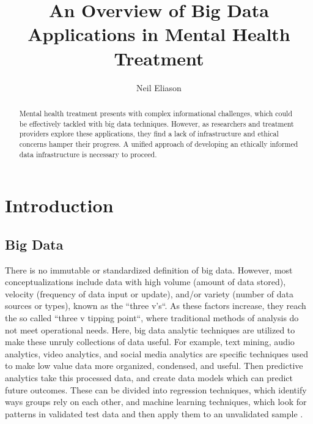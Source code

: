 \documentclass[sigconf]{acmart}
\begin{document}
\title{An Overview of Big Data Applications in Mental Health Treatment}


\author{Neil Eliason}


\renewcommand{\shortauthors}{Eliason}


\begin{abstract}
Mental health treatment presents with complex informational challenges, which could be effectively tackled with big data techniques. However, as researchers and treatment providers explore these applications, they find a lack of infrastructure and ethical concerns hamper their progress. A unified approach of developing an ethically informed data infrastructure is necessary to proceed.

\end{abstract}



\maketitle

\section{Introduction}

\subsection{Big Data}

There is no immutable or standardized definition of big data. However, most conceptualizations include data with high volume (amount of data stored), velocity (frequency of data input or update), and/or variety (number of data sources or types), known as the ``three v's``. As these factors increase, they reach the so called ``three v tipping point``, where traditional methods of analysis do not meet operational needs. Here, big data analytic techniques are utilized to make these unruly collections of data useful. For example, text mining, audio analytics, video analytics, and social media analytics are specific techniques used to make low value data more organized, condensed, and useful. Then predictive analytics take this processed data, and create data models which can predict future outcomes. These can be divided into regression techniques, which identify ways groups rely on each other, and machine learning techniques, which look for patterns in validated test data and then apply them to an unvalidated sample \cite{bdconcepts}.
\end{document}
